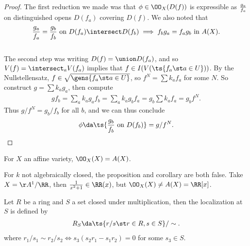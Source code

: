 \begin{proof}

The first reduction we made was that \(\phi \in \OO_X(D(f))\) is
expressible as \(g_a\over f_a\) on distinguished opens \(D(f_a)\)
covering \(D(f)\). We also noted that
\begin{align*}
{g_a \over f_a} = {g_b \over f_b} \text{ on } D(f_a) \intersect D(f_b) \implies f_b g_a = f_a g_b \text{ in } A(X)
.\end{align*}\\

The second step was writing \(D(f) = \union D(f_a)\), and so
\(V(f) = \intersect_a V(f_a)\) implies that
\(f\in I(V(\ts{f_a \st a\in U}))\). By the Nullstellensatz,
\(f\in \sqrt{\gens{f_a \st a\in U}}\), so \(f^N = \sum k_a f_a\) for
some \(N\). So construct \(g = \sum k_a g_a\), then compute
\begin{align*}  
gf_b = \sum_a k_a g_a f_b = \sum_a k_a g_b f_a = g_b \sum k_a f_a = g_b f^N
.\end{align*} Thus \(g/f^N = g_b / f_b\) for all \(b\), and we can thus
conclude
\begin{align*}  
\phi \da \ts{{g_b \over f_b} \text{ on } D(f_b)} = g/f^N
.\end{align*}

\end{proof}

\begin{corollary}[?]

For \(X\) an affine variety, \(\OO_X(X) = A(X)\).

\end{corollary}

\begin{warning}

For \(k\) not algebraically closed, the proposition and corollary are
both false. Take \(X = \AA^1/\RR\), then \({1\over x^2+1} \in \RR(x)\),
but \(\OO_X(X) \neq A(X) = \RR[x]\).

\end{warning}

\begin{definition}[Localization]

Let \(R\) be a ring and \(S\) a set closed under multiplication, then
the localization at \(S\) is defined by
\begin{align*}  
R_S \da \ts{r/s \st r\in R, s\in S} / \sim
.\end{align*} where
\(r_1/s_1 \sim r_2/s_2 \iff s_3(s_2 r_1 - s_1 r_2) = 0\) for some
\(s_3 \in S\).

\end{definition}

